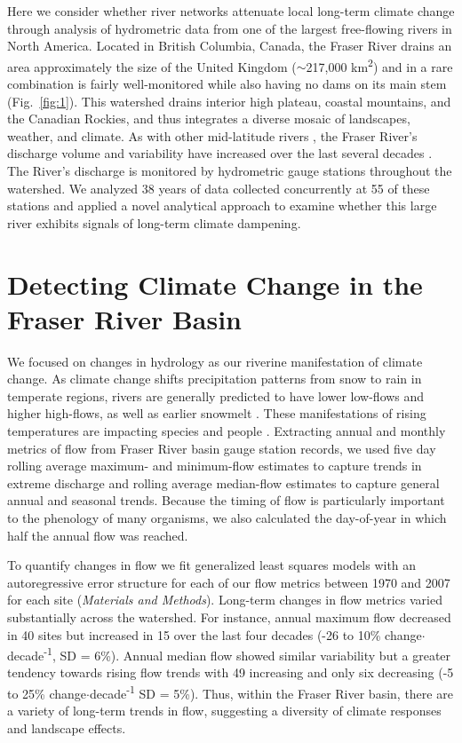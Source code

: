 \documentclass[9pt,twocolumn,twoside,lineno]{pnas-new}
\begin{document}
Here we consider whether river networks attenuate local long-term climate change through analysis of hydrometric data from one of the largest free-flowing rivers in North America. Located in British Columbia, Canada, the Fraser River drains an area approximately the size of the United Kingdom ($\sim$217,000 km\textsuperscript{2}) and in a rare combination is fairly well-monitored while also having no dams on its main stem \cite{Vorosmarty:2010} (Fig.~\ref{fig:1}). This watershed drains interior high plateau, coastal mountains, and the Canadian Rockies, and thus integrates a diverse mosaic of landscapes, weather, and climate. As with other mid-latitude rivers \cite{Bindoff:2013}, the Fraser River's discharge volume and variability have increased over the last several decades \cite{Dery:2012,Morrison:2002}. The River's discharge is monitored by hydrometric gauge stations throughout the watershed. We analyzed 38 years of data collected concurrently at 55 of these stations and applied a novel analytical approach to examine whether this large river exhibits signals of long-term climate dampening.

\section*{Detecting Climate Change in the Fraser River Basin}
We focused on changes in hydrology as our riverine manifestation of climate change. As climate change shifts precipitation patterns from snow to rain in temperate regions, rivers are generally predicted to have lower low-flows and higher high-flows, as well as earlier snowmelt \cite{Nijssen:2001}. These manifestations of rising temperatures are impacting species \cite{Xenopoulos:2006} and people \cite{Hirabayashi:2013}. Extracting annual and monthly metrics of flow from Fraser River basin gauge station records, we used five day rolling average maximum- and minimum-flow estimates to capture trends in extreme discharge and rolling average median-flow estimates to capture general annual and seasonal trends. Because the timing of flow is particularly important to the phenology of many organisms, we also calculated the day-of-year in which half the annual flow was reached. 

To quantify changes in flow we fit generalized least squares models with an autoregressive error structure for each of our flow metrics between 1970 and 2007 for each site (\textit{Materials and Methods}). Long-term changes in flow metrics varied substantially across the watershed. For instance, annual maximum flow decreased in 40 sites but increased in 15 over the last four decades (-26 to 10\% change$\cdot$decade\textsuperscript{-1}, SD = 6\%). Annual median flow showed similar variability but a greater tendency towards rising flow trends with 49 increasing and only six decreasing (-5 to 25\% change$\cdot$decade\textsuperscript{-1} SD = 5\%). Thus, within the Fraser River basin, there are a variety of long-term trends in flow, suggesting a diversity of climate responses and landscape effects.
\end{document}
